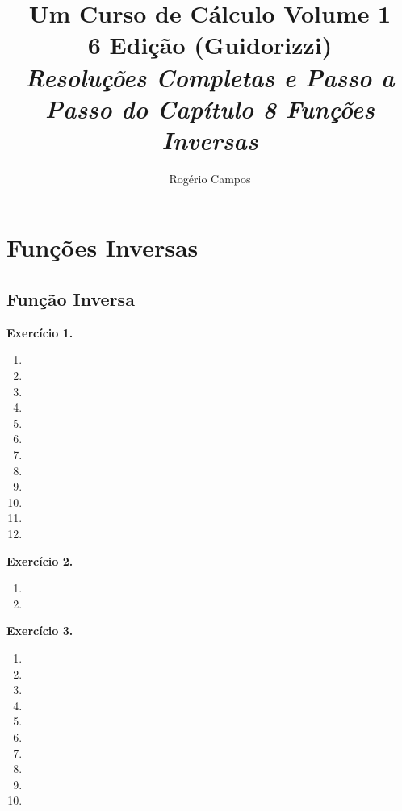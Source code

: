 \documentclass[12pt,a4paper]{article}
\title{
    \Huge \textbf{Um Curso de Cálculo Volume 1} \\
    \vspace{0.3cm}
    \Large 6\textordfeminine{} Edição (Guidorizzi) \\
    \vspace{0.5cm}
    \large \textit{Resoluções Completas e Passo a Passo do Capítulo 8 Funções Inversas}
}
\author{Rogério Campos}
\begin{document}
\maketitle
\newpage

\tableofcontents
\newpage

\setcounter{section}{7}
\setcounter{subsection}{0}

\section{Funções Inversas}

\subsection{Função Inversa}

\vspace{0.5cm}
\noindent\textbf{Exercício 1.}
\begin{enumerate}
    \renewcommand{\theenumi}{\alph{enumi}}
    \renewcommand{\labelenumi}{\theenumi)}
    \item 
    \item 
    \item 
    \item 
    \item 
    \item 
    \item 
    \item 
    \item 
    \item 
    \item 
    \item 
\end{enumerate}

\vspace{0.5cm}
\noindent\textbf{Exercício 2.}
\begin{enumerate}
    \renewcommand{\theenumi}{\alph{enumi}}
    \renewcommand{\labelenumi}{\theenumi)}
    \item 
    \item 
\end{enumerate}

\vspace{0.5cm}
\noindent\textbf{Exercício 3.}
\begin{enumerate}
    \renewcommand{\theenumi}{\alph{enumi}}
    \renewcommand{\labelenumi}{\theenumi)}
    \item 
    \item 
    \item 
    \item 
    \item 
    \item 
    \item 
    \item 
    \item 
    \item 
\end{enumerate}
\end{document}
